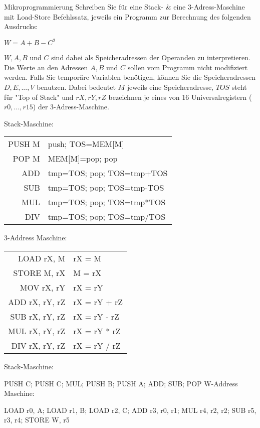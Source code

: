 \documentclass{exercisesheet}
\begin{document}
\begin{exercise}{Mikroprogrammierung}
  Schreiben Sie für eine Stack- \& eine 3-Adress-Maschine mit Load-Store Befehlssatz, jeweils ein Programm zur Berechnung des folgenden Ausdrucks:\points[8]\par
  \begin{center}$W = A + B - C^2$\end{center}
  $W, A, B$ und $C$ sind dabei als Speicheradressen der Operanden zu interpretieren. Die Werte an den Adressen $A, B$ und $C$ sollen vom Programm nicht modifiziert werden. Falls Sie temporäre Variablen benötigen, können Sie die Speicheradressen $D, E, ..., V$ benutzen. Dabei bedeutet $M$ jeweils eine Speicheradresse, $TOS$ steht für "Top of Stack" und $rX, rY, rZ$ bezeichnen je eines von 16 Universalregistern ($r0, ..., r15$) der 3-Adress-Maschine.

  \begin{multicols}{2}
    Stack-Maschine:\par
    \begin{tabular}{|r|l|}
      \hline
      PUSH M & push; TOS=MEM[M]          \\
      POP M  & MEM[M]=pop; pop           \\
      ADD    & tmp=TOS; pop; TOS=tmp+TOS \\
      SUB    & tmp=TOS; pop; TOS=tmp-TOS \\
      MUL    & tmp=TOS; pop; TOS=tmp*TOS \\
      DIV    & tmp=TOS; pop; TOS=tmp/TOS \\
      \hline
    \end{tabular}
    \columnbreak

    3-Address Maschine:\par
    \begin{tabular}{|r|l|}
      \hline
      LOAD rX, M     & rX = M       \\
      STORE M, rX    & M = rX       \\
      MOV rX, rY     & rX = rY      \\
      ADD rX, rY, rZ & rX = rY + rZ \\
      SUB rX, rY, rZ & rX = rY - rZ \\
      MUL rX, rY, rZ & rX = rY * rZ \\
      DIV rX, rY, rZ & rX = rY / rZ \\
      \hline
    \end{tabular}
  \end{multicols}

  \begin{solution}
    Stack-Maschine:\par PUSH C; PUSH C; MUL; PUSH B; PUSH A; ADD; SUB; POP W-Address Maschine:\par LOAD r0, A; LOAD r1, B; LOAD r2, C; ADD r3, r0, r1; MUL r4, r2, r2;  SUB r5, r3, r4; STORE W, r5
  \end{solution}
\end{exercise}
\end{document}
